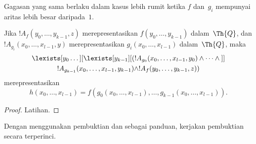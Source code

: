 \documentclass[../../../include/open-logic-section]{subfiles}
\begin{document}
Gagasan yang sama berlaku dalam kasus lebih rumit ketika $f$ dan~$g_i$
mempunyai aritas lebih besar daripada~$1$.

\begin{prop}
Jika $!A_f(y_0, \dots, y_{k-1}, z)$ merepresentasikan
$f(y_0, \dots, y_{k-1})$ dalam~$\Th{Q}$, dan
$!A_{g_i}(x_0, \dots, x_{l-1}, y)$ merepresentasikan
$g_i(x_0, \dots, x_{l-1})$ dalam~$\Th{Q}$, maka
\begin{multline*}
  \lexists[y_0\dots][\lexists[y_{k-1}][(!A_{g_0}(x_0,\dots,x_{l-1},y_0) \land
      \dots \land {}]]\\
  !A_{g_{k-1}}(x_0,\dots,x_{l-1},y_{k-1}) \land !A_f(y_0,\dots,y_{k-1},z))
\end{multline*}
merepresentasikan
\[
h(x_0, \dots, x_{l-1}) = f(g_0(x_0, \dots, x_{l-1}), \dots,
g_{k-1}(x_0, \dots, x_{l-1})).
\]
\end{prop}

\begin{proof}
Latihan.
\end{proof}

\begin{prob}
Dengan menggunakan pembuktian  dan
 sebagai panduan, kerjakan pembuktian
 secara terperinci.
\end{prob}
\end{document}
